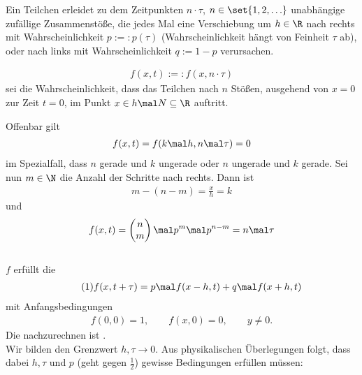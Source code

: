 \begin{beisp}\enter
	Ein Teilchen erleidet zu dem Zeitpunkten $n\cdot\tau$, $n\in\set{1,2,\ldots}$ unabhängige zufällige Zusammenstöße, 
	die jedes Mal eine Verschiebung um $h\in\R$ nach rechts mit Wahrscheinlichkeit $p:=:p(\tau)$ (Wahrscheinlichkeit hängt von Feinheit $\tau$ ab), 
	oder nach links mit Wahrscheinlichkeit $q:=1-p$ verursachen.
	
	\begin{notation}
		\begin{align*}
			f(x,t):=:f(x,n\cdot\tau)
		\end{align*}
		sei die Wahrscheinlichkeit, dass das Teilchen nach $n$ Stößen, ausgehend von $x=0$ zur Zeit $t=0$, im Punkt $x\in h\mal N\subseteq\R$ auftritt.
	\end{notation}
	Offenbar gilt
	\begin{align*}
		f(x,t)=f(k\mal h,n\mal\tau)=0
	\end{align*}
	im Spezialfall, dass  $n$ gerade und $k$ ungerade oder $n$ ungerade und $k$ gerade.
	Sei nun $m\in\N$ die Anzahl der Schritte nach rechts.
	Dann ist
	\begin{align*}
		m-(n-m)=\frac{x}{h}=k
	\end{align*}
	und 
	\begin{align*}
		f(x,t)=
		\begin{pmatrix}
			n\\
			m
		\end{pmatrix}
		\mal p^m\mal p^{n-m}
		=n\mal\tau
	\end{align*}
	\\
	$f$ erfüllt die 
	\begin{align}\label{eq:BeispEinfuehrung1}\tag{1}
		f(x,t+\tau)=p\mal f(x-h,t)+q\mal f(x+h,t)
	\end{align}	 
	mit Anfangsbedingungen
	\begin{align*}
		f(0,0)=1,\qquad
		f(x,0)=0,\qquad
		y\neq0.
	\end{align*}
	Die nachzurechnen ist .\\
	Wir bilden den Grenzwert $h,\tau\longrightarrow 0$.
	Aus physikalischen Überlegungen folgt, dass dabei $h,\tau$ und $p$ (geht gegen $\frac{1}{2}$) gewisse Bedingungen erfüllen müssen:
	\begin{align}\label{eq:BeispEinfuehrung2}\tag{2}

\end{align}
\end{beisp}

